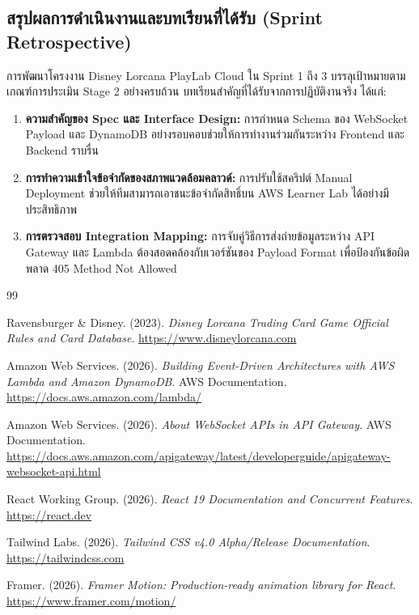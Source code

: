 \documentclass[12pt,a4paper]{article}
\begin{document}
\subsection{สรุปผลการดำเนินงานและบทเรียนที่ได้รับ (Sprint Retrospective)}
การพัฒนาโครงงาน Disney Lorcana PlayLab Cloud ใน Sprint 1 ถึง 3 บรรลุเป้าหมายตามเกณฑ์การประเมิน Stage 2 อย่างครบถ้วน บทเรียนสำคัญที่ได้รับจากการปฏิบัติงานจริง ได้แก่:
\begin{enumerate}[leftmargin=1.5em, itemsep=2pt]
  \item \textbf{ความสำคัญของ Spec และ Interface Design:} การกำหนด Schema ของ WebSocket Payload และ DynamoDB อย่างรอบคอบช่วยให้การทำงานร่วมกันระหว่าง Frontend และ Backend ราบรื่น
  \item \textbf{การทำความเข้าใจข้อจำกัดของสภาพแวดล้อมคลาวด์:} การปรับใช้สคริปต์ Manual Deployment ช่วยให้ทีมสามารถเอาชนะข้อจำกัดสิทธิ์บน AWS Learner Lab ได้อย่างมีประสิทธิภาพ
  \item \textbf{การตรวจสอบ Integration Mapping:} การจับคู่วิธีการส่งถ่ายข้อมูลระหว่าง API Gateway และ Lambda ต้องสอดคล้องกับเวอร์ชันของ Payload Format เพื่อป้องกันข้อผิดพลาด 405 Method Not Allowed
\end{enumerate}

\newpage

\begin{thebibliography}{99}

Ravensburger \& Disney. (2023). \textit{Disney Lorcana Trading Card Game Official Rules and Card Database}. \url{https://www.disneylorcana.com}

Amazon Web Services. (2026). \textit{Building Event-Driven Architectures with AWS Lambda and Amazon DynamoDB}. AWS Documentation. \url{https://docs.aws.amazon.com/lambda/}

Amazon Web Services. (2026). \textit{About WebSocket APIs in API Gateway}. AWS Documentation. \url{https://docs.aws.amazon.com/apigateway/latest/developerguide/apigateway-websocket-api.html}

React Working Group. (2026). \textit{React 19 Documentation and Concurrent Features}. \url{https://react.dev}

Tailwind Labs. (2026). \textit{Tailwind CSS v4.0 Alpha/Release Documentation}. \url{https://tailwindcss.com}

Framer. (2026). \textit{Framer Motion: Production-ready animation library for React}. \url{https://www.framer.com/motion/}

\end{thebibliography}
\end{document}
